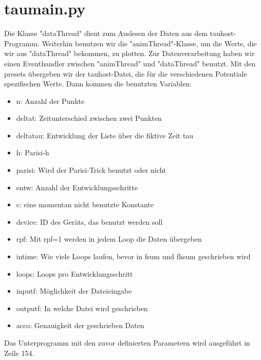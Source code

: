 \documentclass[a4paper,parskip=half,10pt]{scrartcl}
\begin{document}
\section{taumain.py}
Die Klasse "dataThread" dient zum Auslesen der Daten aus dem tauhost-Programm. Weiterhin benutzen wir die "animThread"-Klasse, um die Werte, die wir aus "dataThread" bekommen, zu plotten. Zur Datenverarbeitung haben wir einen Eventhandler zwischen "animThread" und "dataThread" benutzt.
Mit den presets übergeben wir der tauhost-Datei, die für die verschiedenen Potentiale spezifischen Werte.
Dann kommen die benutzten Variablen:
\begin{itemize}
\item n: Anzahl der Punkte
\item deltat: Zeitunterschied zwischen zwei Punkten
\item deltatau: Entwicklung der Liste über die fiktive Zeit tau
\item h: Parisi-h
\item parisi: Wird der Parisi-Trick benutzt oder nicht
\item entw: Anzahl der Entwicklungsschritte
\item c: eine momentan nicht benutzte Konstante
\item device: ID des Geräts, das benutzt werden soll
\item rpf: Mit rpf=1 werden in jedem Loop die Daten übergeben
\item intime: Wie viele Loops laufen, bevor in fsum und fhsum geschrieben wird
\item loops: Loops pro Entwicklungsschritt
\item inputf: Möglichkeit der Dateieingabe
\item outputf: In welche Datei wird geschrieben
\item acco: Genauigkeit der geschrieben Daten
\end{itemize}
Das Unterprogramm mit den zuvor definierten Parametern wird ausgeführt in Zeile 154.
\end{document}
